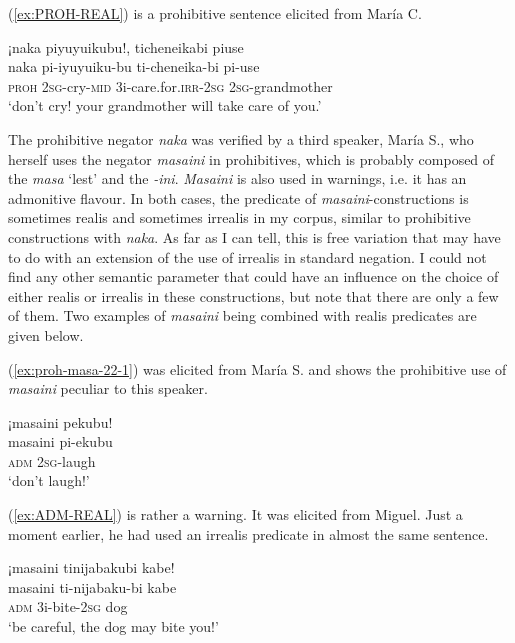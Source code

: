 (\ref{ex:PROH-REAL}) is a prohibitive sentence elicited from María C.

\ea\label{ex:PROH-REAL}
\begingl 
\glpreamble ¡naka piyuyuikubu!, ticheneikabi piuse\\
\gla naka pi-iyuyuiku-bu ti-cheneika-bi pi-use\\ 
\glb \textsc{proh} 2\textsc{sg}-cry-\textsc{mid} 3i-care.for.\textsc{irr}-2\textsc{sg} 2\textsc{sg}-grandmother\\ 
\glft ‘don’t cry! your grandmother will take care of you.’\\ 
\endgl
 \trailingcitation{[uxx-c151002lf]}
\xe

The prohibitive negator \textit{naka} was verified by a third speaker, María S., who herself uses the negator \textit{masaini} in prohibitives, which is probably composed of the   \textit{masa} ‘lest’ and the  \textit{-ini}. \textit{Masaini} is also used in warnings, i.e. it has an admonitive  flavour. In both cases, the predicate of \mbox{\textit{masaini}-}constructions is sometimes realis and sometimes irrealis in my corpus, similar to prohibitive constructions with \textit{naka}. As far as I can tell, this is free variation that may have to do with an extension of the use of irrealis in standard negation. I could not find any other semantic parameter that could have an influence on the choice of either realis or irrealis in these constructions, but note that there are only a few of them. Two examples of \textit{masaini} being combined with realis predicates are given below.

(\ref{ex:proh-masa-22-1}) was elicited from María S. and shows the prohibitive use of \textit{masaini} peculiar to this speaker.

\ea\label{ex:proh-masa-22-1}
\begingl
\glpreamble ¡masaini pekubu!\\
\gla masaini pi-ekubu\\
\glb \textsc{adm} 2\textsc{sg}-laugh\\
\glft ‘don’t laugh!’
\endgl
 \trailingcitation{[rxx-e150220s-1.06]}
\xe

(\ref{ex:ADM-REAL}) is rather a warning. It was elicited from Miguel. Just a moment earlier, he had used an irrealis predicate in almost the same sentence.

\ea\label{ex:ADM-REAL}
\begingl 
\glpreamble ¡masaini tinijabakubi kabe!\\
\gla masaini ti-nijabaku-bi kabe\\ 
\glb \textsc{adm} 3i-bite-2\textsc{sg} dog\\ 
\glft ‘be careful, the dog may bite you!’\\ 
\endgl
 \trailingcitation{[mrx-e150219s.149]}
\xe{} 

